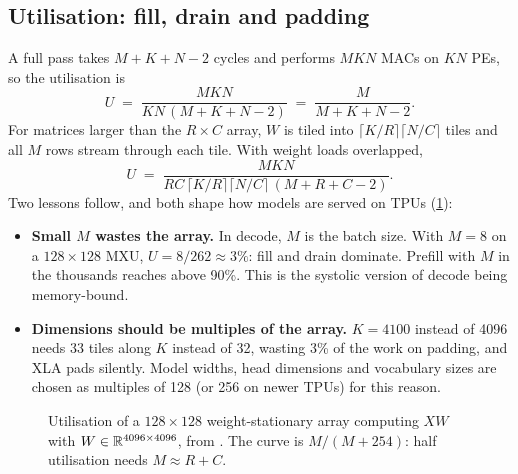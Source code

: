 \subsection{Utilisation: fill, drain and padding}

A full pass takes $M+K+N-2$ cycles and performs $MKN$ MACs on $KN$ PEs, so the utilisation is
\[
  U \;=\; \frac{MKN}{KN\,(M+K+N-2)} \;=\; \frac{M}{M+K+N-2}.
\]
For matrices larger than the $R\times C$ array, $W$ is tiled into $\lceil K/R\rceil\lceil
N/C\rceil$ tiles and all $M$ rows stream through each tile. With weight loads overlapped,
\[
  U \;=\; \frac{MKN}{RC\,\lceil K/R\rceil\lceil N/C\rceil\,(M+R+C-2)}.
\]
Two lessons follow, and both shape how models are served on TPUs (\cref{fig:accel:util}):
\begin{itemize}
  \item \textbf{Small $M$ wastes the array.} In decode, $M$ is the batch size. With $M=8$ on a
    $128\times128$ MXU, $U = 8/262 \approx 3\%$: fill and drain dominate. Prefill with $M$ in the
    thousands reaches above 90\%. This is the systolic version of decode being memory-bound.
  \item \textbf{Dimensions should be multiples of the array.} $K=4100$ instead of 4096 needs 33
    tiles along $K$ instead of 32, wasting 3\% of the work on padding, and XLA pads silently. Model
    widths, head dimensions and vocabulary sizes are chosen as multiples of 128 (or 256 on newer TPUs)
    for this reason.
\end{itemize}

\begin{figure}[t]
\centering
{}
\caption{Utilisation of a $128\times128$ weight-stationary array computing $X W$ with
$W\in\mathbb{R}^{4096\times4096}$, from . The curve is $M/(M+254)$: half
utilisation needs $M\approx R+C$.}
\label{fig:accel:util}
\end{figure}

